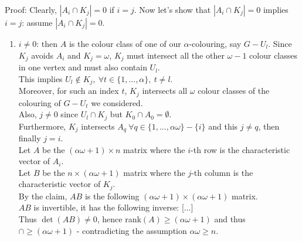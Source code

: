 \begin{enumerate}
\begin{itemize}
					Proof: Clearly, $|A_i \cap K_j| = 0$ if $i=j$. Now let's show that  $|A_i \cap K_j| = 0$ implies $i = j$: assume  $|A_i \cap K_j| = 0$.
						\begin{enumerate}
							\item $i \neq 0$: then $A$ is the colour class of one of our $\alpha$-colouring, say $G - U_l$.
								Since $K_j$ avoids $A_i$ and $K_j = \omega$, $K_j$ must intersect all the other $\omega - 1 $ colour classes in one vertex and must also contain $U_l$.\\
								
								This implies $U_l \notin K_j, ~\forall t \in \{1, ..., \alpha \}, ~t \neq l$.\\
								 
								Moreover, for such an index $t$, $K_j$ intersects all $\omega$ colour classes of the colouring of $G - U_t$ we considered.\\
								
								Also, $j \neq 0$ since $U_l \cap K_j$ but $K_0 \cap A_0 = \emptyset$.\\
								 
								Furthermore, $K_j$ intersects $A_q ~ \forall q \in \{1, ..., \alpha \omega \} - \{i \}$ and this $j \neq q$, then finally $j = i$.\\
								
								Let $A$ be the $(\alpha \omega + 1) \times n$ matrix where the $i$-th row is the characteristic vector of $A_i$.\\
								
								Let $B$ be the $n \times (\alpha \omega + 1)$ matrix where the $j$-th column is the characteristic vector of $K_j$.\\
								By the claim, $AB$ is the following $(\alpha \omega + 1) \times (\alpha \omega + 1)$ matrix.\\
								$AB$ is invertible, it has the following inverse: 
								[...] \\
								
								Thus $\det(AB) \neq 0$, hence rank$(A) \geq (\alpha \omega + 1)$ and thus $\cap \geq (\alpha \omega + 1)$ - contradicting the assumption $\alpha \omega \geq n$.
						\end{enumerate}
			\end{itemize}
	\end{enumerate}
	
	
	
	
	
	
	
	
	
	
	